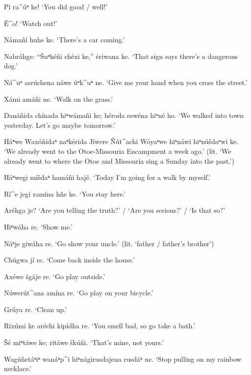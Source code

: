 \documentclass[output=paper]{LSP/langsci}
\begin{document}

\begin{list}{}{} \itemsep1pt \parskip0pt 
\item{Pi ra\^{ }úⁿ ke! `You did good / well!'}
\item{\'E\^{ }o! `Watch out!'}
\item{Námañí huhe ke. `There's a car coming.'}
\item{Nabráhge: ``\v{S}uⁿkéñi chéxi ke,'' ériwana ke. `That sign says there's a dangerous dog.'}
\item{Ná\^{ }uⁿ asrúchena náwe úⁿk\^{ }uⁿ ne. `Give me your hand when you cross the street.'}
\item{Xámi amáñi ne. `Walk on the grass.'}
\item{Danáñida chínada hiⁿwámañi ke; héroda eswéna hiⁿné ho. `We walked into town yesterday. Let's go maybe tomorrow.'}
\item{Háⁿwe Waxóñidaⁿ naⁿkérida Jíwere \~Nút\^{ }achi Wóyaⁿwe hiⁿnáwi hiⁿnúšdaⁿwi ke. `We already went to the Otoe-Missouria Encampment a week ago.' (lit. `We already went to where the Otoe and Missouria sing a Sunday into the past.')}
\item{Háⁿwegi míšdaⁿ hamáñi hajé.  `Today I'm going for a walk by myself.'}
\item{Rí\^{ }e jegí ramína hñe ke. `You stay here.'}
\item{Aréhga je? `Are you telling the truth?' / `Are you serious?' / `Is that so?'}
\item{Hiⁿwáha re. `Show me.'}
\item{Náⁿje giwáha re. `Go show your uncle.' (lit. `father / father's brother')}
\item{Chúgwa jí re.	`Come back inside the house.'}
\item{}
\item{Axéwe šgáje re. `Go play outside.'}
\item{Núwerút\^{ }ana amína re.	`Go play on your bicycle.'}
\item{Grúya re.	`Clean up.'}
\item{Rixúmi ke aréchi kipídha re. `You smell bad, so go take a bath.'}
\item{\v{S}é miⁿtáwe ke;  ritáwe škúñi. `That's mine, not yours.'}
\item{Wagúñetáⁿiⁿ wanáⁿp\^{ }i hiⁿnágirusdajena rusdáⁿ ne. `Stop pulling on my rainbow necklace.'}
\end{list} 
 
\end{document}
